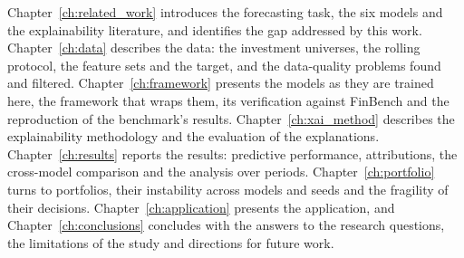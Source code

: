 Chapter~\ref{ch:related_work} introduces the forecasting task, the six models and the explainability literature, and identifies the gap addressed by this work. Chapter~\ref{ch:data} describes the data: the investment universes, the rolling protocol, the feature sets and the target, and the data-quality problems found and filtered. Chapter~\ref{ch:framework} presents the models as they are trained here, the framework that wraps them, its verification against FinBench and the reproduction of the benchmark's results. Chapter~\ref{ch:xai_method} describes the explainability methodology and the evaluation of the explanations. Chapter~\ref{ch:results} reports the results: predictive performance, attributions, the cross-model comparison and the analysis over periods. Chapter~\ref{ch:portfolio} turns to portfolios, their instability across models and seeds and the fragility of their decisions. Chapter~\ref{ch:application} presents the application, and Chapter~\ref{ch:conclusions} concludes with the answers to the research questions, the limitations of the study and directions for future work.
